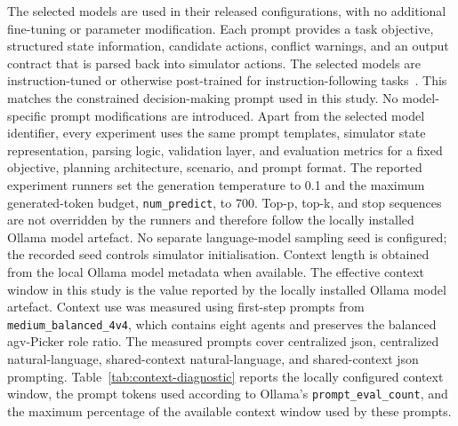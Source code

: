 The selected models are used in their released configurations, with no additional fine-tuning or parameter modification.
Each prompt provides a task objective, structured state information, candidate actions, conflict warnings, and an output contract that is parsed back into simulator actions.
The selected models are instruction-tuned or otherwise post-trained for instruction-following tasks~\cite{meta2024llama32,jiang2023mistral7b,gemmateam2025gemma3,abdin2024phi4,yang2024qwen25}.
This matches the constrained decision-making prompt used in this study.
No model-specific prompt modifications are introduced.
Apart from the selected model identifier, every experiment uses the same prompt templates, simulator state representation, parsing logic, validation layer, and evaluation metrics for a fixed objective, planning architecture, scenario, and prompt format.
The reported experiment runners set the generation temperature to 0.1 and the maximum generated-token budget, \nolinkurl{num_predict}, to 700.
Top-p, top-k, and stop sequences are not overridden by the runners and therefore follow the locally installed Ollama model artefact.
No separate language-model sampling seed is configured; the recorded seed controls simulator initialisation.
Context length is obtained from the local Ollama model metadata when available.
The effective context window in this study is the value reported by the locally installed Ollama model artefact.
Context use was measured using first-step prompts from \nolinkurl{medium_balanced_4v4}, which contains eight agents and preserves the balanced \gls{agv}-Picker role ratio.
The measured prompts cover centralized \gls{json}, centralized natural-language, shared-context natural-language, and shared-context \gls{json} prompting.
Table~\ref{tab:context-diagnostic} reports the locally configured context window, the prompt tokens used according to Ollama's \nolinkurl{prompt_eval_count}, and the maximum percentage of the available context window used by these prompts.

